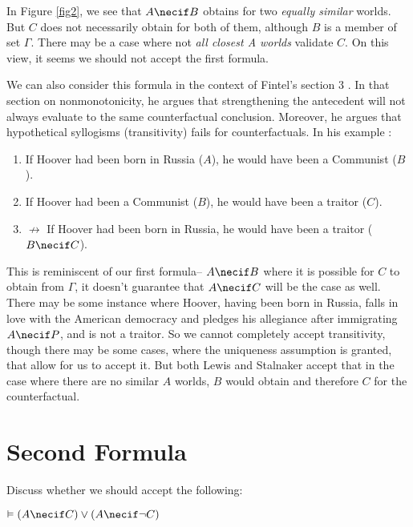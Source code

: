 \documentclass{article}
\begin{document}
        In Figure \ref{fig2}, we see that $A \necif B$ obtains for two \textit{equally similar} worlds. But $C$ does not necessarily obtain for both of them, although $B$ is a member of set $\Gamma$.
        There may be a case where not \textit{all closest A worlds} validate $C$. On this view, it seems we should not accept the first formula.
        
        We can also consider this formula in the context of Fintel's section 3 \cite{fintel}. In that section on nonmonotonicity, he argues that strengthening the antecedent will not always evaluate to the same counterfactual conclusion.
        Moreover, he argues that hypothetical syllogisms (transitivity) fails for counterfactuals. In his example \cite{fintel}:

        \begin{enumerate}
            \item If Hoover had been born in Russia ($A$), he would have been a Communist ($B$).
            \item If Hoover had been a Communist ($B$), he would have been a traitor ($C$).
            \item $\nrightarrow$ If Hoover had been born in Russia, he would have been a traitor ($B \necif C$).
        \end{enumerate}

        This is reminiscent of our first formula-- $A \necif B$ where it is possible for $C$ to obtain from $\Gamma$, it doesn't guarantee that $A \necif C$ will be the case as well.
        There may be some instance where Hoover, having been born in Russia, falls in love with the American democracy and pledges his allegiance after immigrating $A \necif P$, and is not a traitor.
        So we cannot completely accept transitivity, though there may be some cases, where the uniqueness assumption is granted, that allow for us to accept it.
        But both Lewis and Stalnaker accept that in the case where there are no similar $A$ worlds, $B$ would obtain and therefore $C$ for the counterfactual.



    \section{Second Formula}
    \begin{task}
        Discuss whether we should accept the following:
        \begin{center}
            $\vDash (A \necif C) \vee (A \necif \lnot C)$
        \end{center}
    \end{task}
\end{document}
